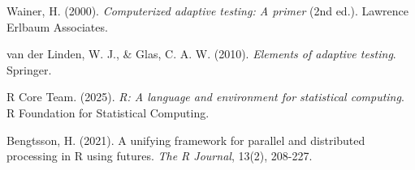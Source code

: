\documentclass[11pt]{article}
\begin{document}

\begin{thebibliography}{9}

Wainer, H. (2000). \textit{Computerized adaptive testing: A primer} (2nd ed.). Lawrence Erlbaum Associates.

van der Linden, W. J., \& Glas, C. A. W. (2010). \textit{Elements of adaptive testing}. Springer.

R Core Team. (2025). \textit{R: A language and environment for statistical computing}. R Foundation for Statistical Computing.

Bengtsson, H. (2021). A unifying framework for parallel and distributed processing in R using futures. \textit{The R Journal}, 13(2), 208-227.

\end{thebibliography}
\end{document}
